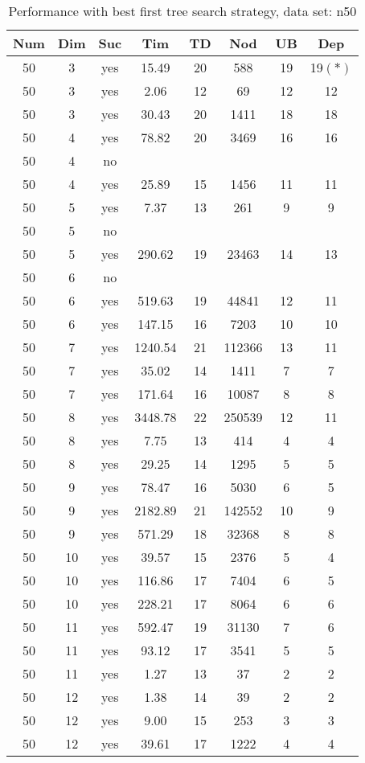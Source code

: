 \begin{table}[!htb]
  \centering
  \begin{tabular}[center]{|c|c|c|c|c|c|c|c|}
    \hline
    Num & Dim & Suc & Tim & TD & Nod & UB & Dep \\
    \hline
    50 & 3 & yes & 15.49 & 20 & 588 & 19 & 19$(*)$ \\
    50 & 3 & yes & 2.06 & 12 & 69 & 12 & 12 \\
    50 & 3 & yes & 30.43 & 20 & 1411 & 18 & 18 \\
    50 & 4 & yes & 78.82 & 20 & 3469 & 16 & 16 \\
    50 & 4 & no &  &  &  &  &  \\
    50 & 4 & yes & 25.89 & 15 & 1456 & 11 & 11 \\
    50 & 5 & yes & 7.37 & 13 & 261 & 9 & 9 \\
    50 & 5 & no &  &  &  &  &  \\
    50 & 5 & yes & 290.62 & 19 & 23463 & 14 & 13 \\
    50 & 6 & no &  &  &  &  &  \\
    50 & 6 & yes & 519.63 & 19 & 44841 & 12 & 11 \\
    50 & 6 & yes & 147.15 & 16 & 7203 & 10 & 10 \\
    50 & 7 & yes & 1240.54 & 21 & 112366 & 13 & 11 \\
    50 & 7 & yes & 35.02 & 14 & 1411 & 7 & 7 \\
    50 & 7 & yes & 171.64 & 16 & 10087 & 8 & 8 \\
    50 & 8 & yes & 3448.78 & 22 & 250539 & 12 & 11 \\
    50 & 8 & yes & 7.75 & 13 & 414 & 4 & 4 \\
    50 & 8 & yes & 29.25 & 14 & 1295 & 5 & 5 \\
    50 & 9 & yes & 78.47 & 16 & 5030 & 6 & 5 \\
    50 & 9 & yes & 2182.89 & 21 & 142552 & 10 & 9 \\
    50 & 9 & yes & 571.29 & 18 & 32368 & 8 & 8 \\
    50 & 10 & yes & 39.57 & 15 & 2376 & 5 & 4 \\
    50 & 10 & yes & 116.86 & 17 & 7404 & 6 & 5 \\
    50 & 10 & yes & 228.21 & 17 & 8064 & 6 & 6 \\
    50 & 11 & yes & 592.47 & 19 & 31130 & 7 & 6 \\
    50 & 11 & yes & 93.12 & 17 & 3541 & 5 & 5 \\
    50 & 11 & yes & 1.27 & 13 & 37 & 2 & 2 \\
    50 & 12 & yes & 1.38 & 14 & 39 & 2 & 2 \\
    50 & 12 & yes & 9.00 & 15 & 253 & 3 & 3 \\
    50 & 12 & yes & 39.61 & 17 & 1222 & 4 & 4 \\
    \hline
  \end{tabular}
  \caption{Performance with best first tree search strategy, data set: n50}
  \label{tab:test.sel-n50}
\end{table}

